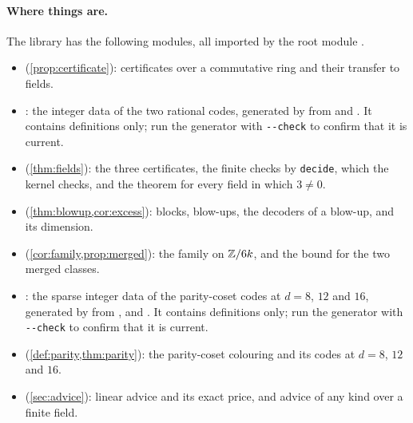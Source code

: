 \paragraph{Where things are.} The library  has the following modules, all imported by
the root module .
\begin{itemize}[leftmargin=1.5em]\raggedright
\item {} (\cref{prop:certificate}): certificates over a commutative ring and their transfer to
fields.
\item {}: the integer data of the two rational codes, generated by
 from  and
. It contains definitions only; run the generator with \texttt{-{}-check} to confirm
that it is current.
\item {} (\cref{thm:fields}): the three certificates, the finite checks by \texttt{decide}, which
the kernel checks, and the theorem for every field in which $3\ne0$.
\item {} (\cref{thm:blowup,cor:excess}): blocks, blow-ups, the decoders of a blow-up, and its
dimension.
\item {} (\cref{cor:family,prop:merged}): the family on $\mathbb{Z}/6k$, and the bound for the two merged
classes.
\item {}: the sparse integer data of the parity-coset codes at $d=8$, $12$ and $16$,
generated by  from ,
 and . It contains definitions
only; run the generator with \texttt{-{}-check} to confirm that it is current.
\item {} (\cref{def:parity,thm:parity}): the parity-coset colouring and its codes at $d=8$,
$12$ and $16$.
\item {} (\cref{sec:advice}): linear advice and its exact price, and advice of any kind over a
finite field.
\end{itemize}

